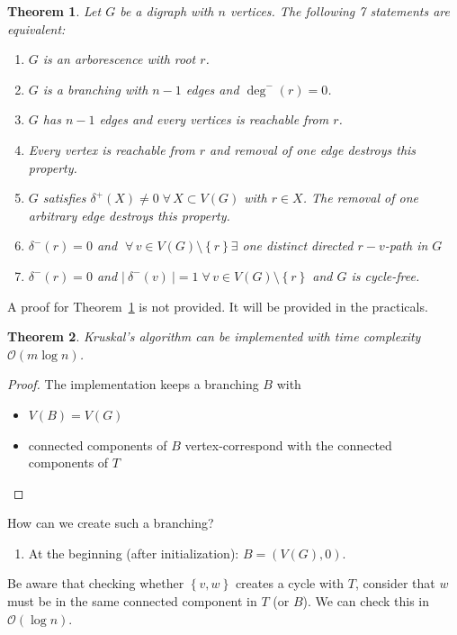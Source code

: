 \documentclass{article}
\newtheorem{theorem}{Theorem}
\newcommand{\card}[1]{\left|\:\!#1\:\!\right|}
\newcommand{\set}[1]{\left\{#1\right\}}
\newcommand{\fall}{\;\forall\,}
\newcommand{\noproof}[1]{A proof for Theorem~\ref{#1} is not provided.}
\begin{document}
\begin{theorem}\label{satz-2.4}
  Let $G$ be a digraph with $n$ vertices. The following 7 statements are equivalent:
\begin{enumerate}
  \item $G$ is an arborescence with root $r$.
  \item $G$ is a branching with $n-1$ edges and $\operatorname{deg}^-(r) = 0$.
  \item $G$ has $n-1$ edges and every vertices is reachable from $r$.
  \item Every vertex is reachable from $r$ and removal of one edge destroys this property.
  \item $G$ satisfies $\delta^+(X) \neq 0 \fall X \subset V(G)$ with $r \in X$. The removal of one arbitrary edge destroys this property.
  \item $\delta^-(r) = 0$ and $\fall v \in V(G) \setminus \set{r} \exists$ one distinct directed $r-v$-path in $G$
  \item $\delta^-(r) = 0$ and $\card{\delta^-(v)} = 1 \fall v \in V(G) \setminus \set{r}$ and $G$ is cycle-free.
\end{enumerate}
\end{theorem}

\noproof{satz-2.4} It will be provided in the practicals.

\begin{theorem}\label{satz-2.5}
  Kruskal's algorithm can be implemented with time complexity $\mathcal{O}(m \log{n})$.
\end{theorem}

\begin{proof}
  The implementation keeps a branching $B$ with
  \begin{itemize}
    \item $V(B) = V(G)$
    \item connected components of $B$ vertex-correspond with the connected components of $T$
  \end{itemize}
\end{proof}

How can we create such a branching?
\begin{enumerate}
  \item At the beginning (after initialization): $B = (V(G), 0)$.
\end{enumerate}

Be aware that checking whether $\set{v, w}$ creates a cycle with $T$, consider that $w$ must be in the same connected component in $T$ (or $B$).
We can check this in $\mathcal{O}(\log{n})$.
\end{document}
